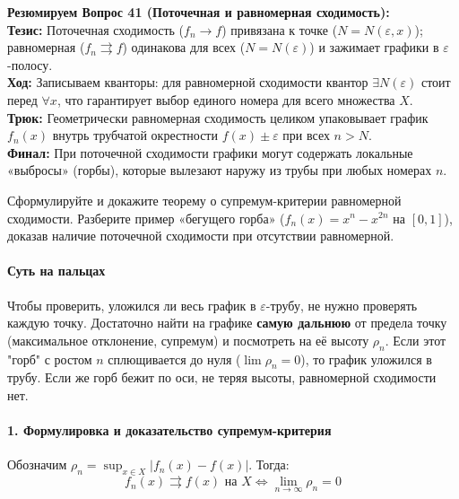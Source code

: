 \begin{tcolorbox}[colback=gray!5, colframe=black, boxrule=0.5pt, arc=0pt]
\textbf{Резюмируем Вопрос 41 (Поточечная и равномерная сходимость):} \\
\textbf{Тезис:} Поточечная сходимость ($f_n \to f$) привязана к точке ($N = N(\varepsilon, x)$); равномерная ($f_n \rightrightarrows f$) одинакова для всех ($N = N(\varepsilon)$) и зажимает графики в $\varepsilon$-полосу. \\
\textbf{Ход:} Записываем кванторы: для равномерной сходимости квантор $\exists N(\varepsilon)$ стоит перед $\forall x$, что гарантирует выбор единого номера для всего множества $X$. \\
\textbf{Трюк:} Геометрически равномерная сходимость целиком упаковывает график $f_n(x)$ внутрь трубчатой окрестности $f(x) \pm \varepsilon$ при всех $n > N$. \\
\textbf{Финал:} При поточечной сходимости графики могут содержать локальные «выбросы» (горбы), которые вылезают наружу из трубы при любых номерах $n$.
\end{tcolorbox}



{Сформулируйте и докажите теорему о супремум-критерии равномерной сходимости. Разберите пример «бегущего горба» ($f_n(x) = x^n - x^{2n}$ на $[0,1]$), доказав наличие поточечной сходимости при отсутствии равномерной.}

\paragraph{Суть на пальцах}
Чтобы проверить, уложился ли весь график в $\varepsilon$-трубу, не нужно проверять каждую точку. Достаточно найти на графике \textbf{самую дальнюю} от предела точку (максимальное отклонение, супремум) и посмотреть на её высоту $\rho_n$. Если этот "горб" с ростом $n$ сплющивается до нуля ($\lim \rho_n = 0$), то график уложился в трубу. Если же горб бежит по оси, не теряя высоты, равномерной сходимости нет.

\paragraph{1. Формулировка и доказательство супремум-критерия}
Обозначим $\rho_n = \sup_{x \in X} |f_n(x) - f(x)|$. Тогда:
$$ f_n(x) \rightrightarrows f(x) \text{ на } X \iff \lim_{n \to \infty} \rho_n = 0 $$


